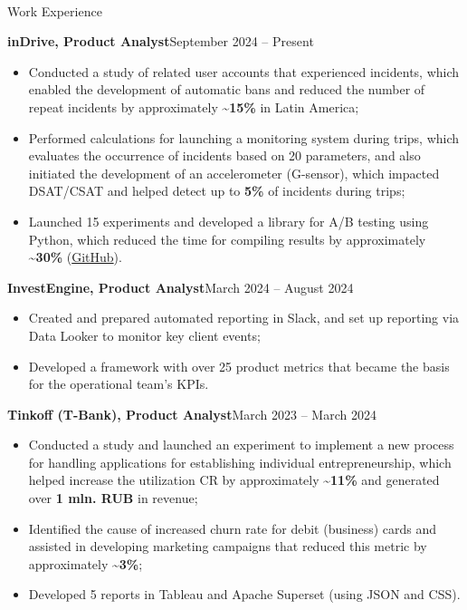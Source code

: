 \documentclass[]{mcdowellcv}
\renewenvironment{cvsubsection}[2]{%
  \begin{adjustwidth}{\subsectionmargin}{\subsectionmargin}%
    {\bfseries #1}\hfill #2\par\vspace{0.5em}%
}{%
  \end{adjustwidth}%
  \vspace*{\aftersubsectionspace}%
}
\renewcommand{\makeheader}{%
  \begin{center}
    \printname\\[0.5em]%
    \printcontacts%
  \end{center}%
  \vspace*{\afterheaderspace}%
}
\begin{document}
	\makeheader
	
	\begin{cvsection}{\Large Work Experience}
		\begin{cvsubsection}{inDrive, Product Analyst}{September 2024 -- Present}
			\begin{itemize}
				\item Conducted a study of related user accounts that experienced incidents, which enabled the development of automatic bans and reduced the number of repeat incidents by approximately \textbf{\textasciitilde 15\%} in Latin America;
				\item Performed calculations for launching a monitoring system during trips, which evaluates the occurrence of incidents based on 20 parameters, and also initiated the development of an accelerometer (G-sensor), which impacted DSAT/CSAT and helped detect up to \textbf{5\%} of incidents during trips;
				\item Launched 15 experiments and developed a library for A/B testing using Python, which reduced the time for compiling results by approximately \textbf{\textasciitilde 30\%} (\href{https://github.com/Renarion/expab}{GitHub}).
			\end{itemize}
		\end{cvsubsection}
		
		\begin{cvsubsection}{InvestEngine, Product Analyst}{March 2024 -- August 2024}
			\begin{itemize}
				\item Created and prepared automated reporting in Slack, and set up reporting via Data Looker to monitor key client events;
				\item Developed a framework with over 25 product metrics that became the basis for the operational team's KPIs.
			\end{itemize}
		\end{cvsubsection}
		
		\begin{cvsubsection}{Tinkoff (T-Bank), Product Analyst}{March 2023 -- March 2024}		
			\begin{itemize}
				\item Conducted a study and launched an experiment to implement a new process for handling applications for establishing individual entrepreneurship, which helped increase the utilization CR by approximately \textbf{\textasciitilde 11\%} and generated over \textbf{1 mln. RUB} in revenue;
				\item Identified the cause of increased churn rate for debit (business) cards and assisted in developing marketing campaigns that reduced this metric by approximately \textbf{\textasciitilde 3\%};
				\item Developed 5 reports in Tableau and Apache Superset (using JSON and CSS).
			\end{itemize}
		\end{cvsubsection}
		

\end{cvsection}
\end{document}
